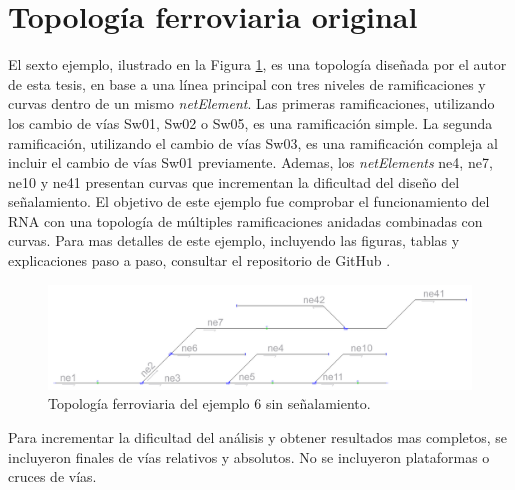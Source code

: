 \section{Topología ferroviaria original}

	El sexto ejemplo, ilustrado en la Figura \ref{fig:EJ6_1}, es una topología diseñada por el autor de esta tesis, en base a una línea principal con tres niveles de ramificaciones y curvas dentro de un mismo \textit{netElement}. Las primeras ramificaciones, utilizando los cambio de vías Sw01, Sw02 o Sw05, es una ramificación simple. La segunda ramificación, utilizando el cambio de vías Sw03, es una ramificación compleja al incluir el cambio de vías Sw01 previamente. Ademas, los \textit{netElements} ne4, ne7, ne10 y ne41 presentan curvas que incrementan la dificultad del diseño del señalamiento. El objetivo de este ejemplo fue comprobar el funcionamiento del RNA con una topología de múltiples ramificaciones anidadas combinadas con curvas. Para mas detalles de este ejemplo, incluyendo las figuras, tablas y explicaciones paso a paso, consultar el repositorio de GitHub \cite{GITHUB_PHD}.
	
	\begin{figure}[h]
		\centering
		\includegraphics[width=1\textwidth]{resultados-obtenidos/ejemplo6/images/6_empty.png}
		\centering\caption{Topología ferroviaria del ejemplo 6 sin señalamiento.}
		\label{fig:EJ6_1}
	\end{figure}
	
	Para incrementar la dificultad del análisis y obtener resultados mas completos, se incluyeron finales de vías relativos y absolutos. No se incluyeron plataformas o cruces de vías.
